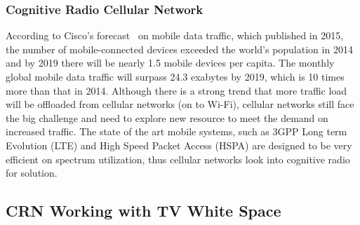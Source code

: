 \subsubsection*{Cognitive Radio Cellular Network}
According to Cisco's forecast~\cite{Cisco_report_2015} on mobile data traffic, which published in 2015, the number of mobile-connected devices exceeded the world’s population in 2014 and by 2019 there will be nearly 1.5 mobile devices per capita.
The monthly global mobile data traffic will surpass 24.3 exabytes by 2019, which is 10 times more than that in 2014.
Although there is a strong trend that more traffic load will be offloaded from cellular networks (on to Wi-Fi), cellular networks still face the big challenge and need to explore new resource to meet the demand on increased traffic.
The state of the art mobile systems, such as 3GPP Long term Evolution (\gls{LTE}) and High Speed Packet Access (\gls{HSPA}) are designed to be very efficient on spectrum utilization, thus cellular networks look into cognitive radio for solution.

\subsection{CRN Working with TV White Space}
\label{TVWS}

